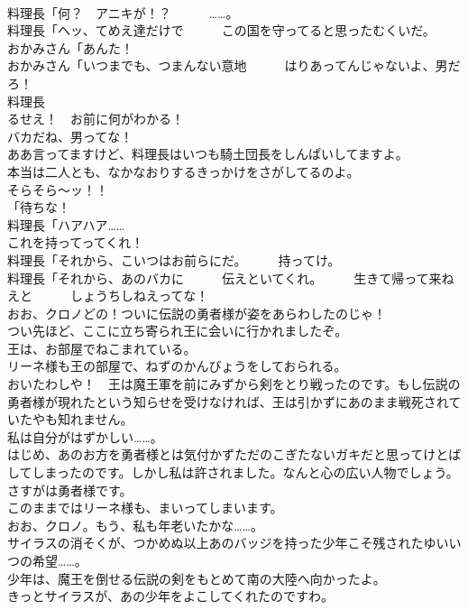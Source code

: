 \documentclass[8pt]{extreport}
\begin{document}
\begin{CJK}{UTF8}{min}
\\	料理長「何？　アニキが！？　　　……。	
\\	料理長「ヘッ、てめえ達だけで　　　この国を守ってると思ったむくいだ。	
\\	おかみさん「あんた！	
\\	おかみさん「いつまでも、つまんない意地　　　はりあってんじゃないよ、男だろ！	
\\	料理長
\\	るせえ！　お前に何がわかる！	
\\	バカだね、男ってな！	
\\	ああ言ってますけど、料理長はいつも騎土団長をしんぱいしてますよ。	
\\	本当は二人とも、なかなおりするきっかけをさがしてるのよ。	
\\	そらそら～ッ！！	
\\	「待ちな！	
\\	料理長「ハアハア……	
\\	これを持ってってくれ！	
\\	料理長「それから、こいつはお前らにだ。　　　持ってけ。	
\\	料理長「それから、あのバカに　　　伝えといてくれ。　　　生きて帰って来ねえと　　　しょうちしねえってな！	
\\	おお、クロノどの！ついに伝説の勇者様が姿をあらわしたのじゃ！	
\\	つい先ほど、ここに立ち寄られ王に会いに行かれましたぞ。	
\\	王は、お部屋でねこまれている。	
\\	リーネ様も王の部屋で、ねずのかんびょうをしておられる。	
\\	おいたわしや！　王は魔王軍を前にみずから剣をとり戦ったのです。もし伝説の勇者様が現れたという知らせを受けなければ、王は引かずにあのまま戦死されていたやも知れません。	
\\	私は自分がはずかしい……。	
\\	はじめ、あのお方を勇者様とは気付かずただのこぎたないガキだと思ってけとばしてしまったのです。しかし私は許されました。なんと心の広い人物でしょう。さすがは勇者様です。	
\\	このままではリーネ様も、まいってしまいます。	
\\	おお、クロノ。もう、私も年老いたかな……。	
\\	サイラスの消そくが、つかめぬ以上あのバッジを持った少年こそ残されたゆいいつの希望……。	
\\	少年は、魔王を倒せる伝説の剣をもとめて南の大陸へ向かったよ。	
\\	きっとサイラスが、あの少年をよこしてくれたのですわ。	

\end{CJK}
\end{document}

